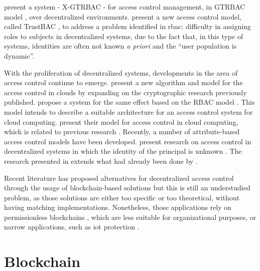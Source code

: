 \citeauthor{bhatti_x-gtrbac_2004} \cite{bhatti_x-gtrbac_2004} present a system - X-GTRBAC - for access control management, in GTRBAC model \cite{joshi_generalized_2005}, over decentralized environments. \citeauthor{chakraborty_trustbac:_2006} \cite{chakraborty_trustbac:_2006} present a new access control model, called TrustBAC \cite{chakraborty_trustbac:_2006}, to address a problem identified in \gls{rbac}: difficulty in assigning roles to subjects in decentralized systems, due to the fact that, in this type of systems, identities are often not known \emph{a priori} and the “user population is dynamic”.

With the proliferation of decentralized systems, developments in the area of access control continue
to emerge. \citeauthor{ruj_dacc:_2011} \cite{ruj_dacc:_2011} present a new algorithm and model for the access control \cite{ruj_dacc:_2011} in clouds by expanding on the cryptographic research previously published. \citeauthor{calero_toward_2010} \cite{calero_toward_2010} propose a system for the same effect based on the RBAC model \cite{calero_toward_2010}. This model intends to describe a suitable architecture for an access control system for cloud computing. \citeauthor{yu_achieving_2010} \cite{yu_achieving_2010} present their model for access control in cloud computing, which is related to previous research \cite{calero_toward_2010}. Recently, a number of attribute-based access control models have been developed. \citeauthor{ruj_decentralized_2014} \cite{ruj_decentralized_2014} present research on access control in decentralized systems in which the identity of the principal is unknown \cite{ruj_decentralized_2014}. The research presented in \cite{ruj_decentralized_2014} extends what had already been done by \citeauthor{ruj_privacy_2012} \cite{ruj_privacy_2012}.

Recent literature has proposed alternatives for decentralized access control through the usage of blockchain-based solutions but this is still an understudied problem, as those solutions are either too specific or too theoretical, without having matching implementations. Nonetheless, those applications rely on permissionless blockchains \cite{maesa_blockchain_2017}, which are less suitable for organizational purposes, or narrow applications, such as \gls{iot} protection \cite{ouaddah_fairaccess:_2017}.

\section{Blockchain}
\label{sec:related-blockchain}

